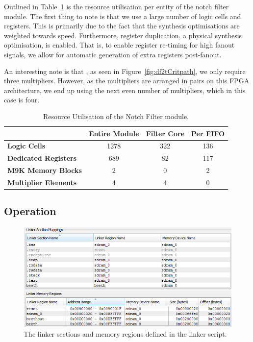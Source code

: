\documentclass[]{article}
\begin{document}
Outlined in Table~\ref{tab:resource_util_notch} is the resource utilisation per entity of the notch filter module.
The first thing to note is that we use a large number of logic cells and registers. This is primarily due to the fact that the synthesis optimisations are weighted towards speed.
Furthermore, register duplication, a physical synthesis optimisation, is enabled. That is, to enable register re-timing for high fanout signals, we allow for automatic generation of extra registers post-fanout.

An interesting note is that , as seen in Figure~\ref{fig:df2tCritpath}, we only require three multipliers. However, as the multipliers are arranged in pairs on this FPGA architecture, we end up using the next even number of multipliers, which in this case is four.

\begin{table}[tbp]
	\caption{Resource Utilisation of the Notch Filter module.}
	\label{tab:resource_util_notch}
	\begin{center}
		\begin{tabular}{l|ccc}
		\hline

		\hline
											& \textbf{Entire Module} 	& \textbf{Filter Core} 	& \textbf{Per FIFO}\\
		\hline
			\textbf{Logic Cells} 			& 1278 						& 322 					& 136 \\
		\hline
			\textbf{Dedicated Registers}	& 689						& 82 					& 117 \\
		\hline
			\textbf{M9K Memory Blocks}		& 2							& 0 					& 2 \\
		\hline
			\textbf{Multiplier Elements}	& 4							& 4 					& 0 \\
		\hline

		\hline
		\end{tabular}
	\end{center}
\end{table}


\subsection{Operation} %
\label{sub:operation}

\begin{figure}[btp]
	\begin{center}
		\includegraphics[width = \textwidth]{linkersections.PNG}
	\end{center}
	\caption{The linker sections and memory regions defined in the linker script.}
	\label{fig:linkersections}
\end{figure}
\end{document}
